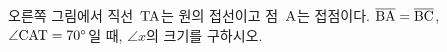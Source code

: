 \noindent\begin{minipage}[t]{0.58\linewidth}\vspace{0pt}\raggedright 오른쪽 그림에서 직선~$\mathrm{TA}$는 원의 접선이고 점~$\mathrm{A}$는 접점이다. $\overline{\mathrm{BA}}=\overline{\mathrm{BC}}$, $\angle\mathrm{CAT}=70^\circ$일 때, $\angle x$의 크기를 구하시오.\end{minipage}\hfill\begin{minipage}[t]{0.4\linewidth}\vspace{0pt}\centering \resizebox{\ifdim\width>\linewidth\linewidth\else\width\fi}{!}{}\end{minipage}\par
